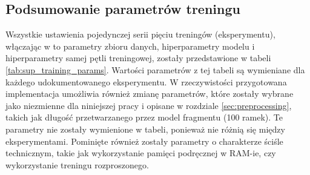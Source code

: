 \subsection{Podsumowanie parametrów treningu}

Wszystkie ustawienia pojedynczej serii pięciu treningów (eksperymentu), włączając w to parametry zbioru danych, hiperparametry modelu i hiperparametry samej pętli treningowej, zostały przedstawione w tabeli \ref{tab:sup_training_params}. Wartości parametrów z tej tabeli są wymieniane dla każdego udokumentowanego eksperymentu. W rzeczywistości przygotowana implementacja umożliwia również zmianę parametrów, które zostały wybrane jako niezmienne dla niniejszej pracy i opisane w rozdziale \ref{sec:preprocessing}, takich jak długość przetwarzanego przez model fragmentu (100 ramek). Te parametry nie zostały wymienione w tabeli, ponieważ nie różnią się między eksperymentami. Pominięte również zostały parametry o charakterze ściśle technicznym, takie jak wykorzystanie pamięci podręcznej w RAM-ie, czy wykorzystanie treningu rozproszonego.


